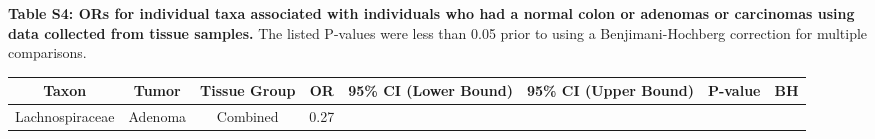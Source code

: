\documentclass[12pt,]{article}
\begin{document}
\normalsize

\newpage

\textbf{Table S4: ORs for individual taxa associated with individuals
who had a normal colon or adenomas or carcinomas using data collected
from tissue samples.} The listed P-values were less than 0.05 prior to
using a Benjimani-Hochberg correction for multiple comparisons.

\scriptsize

\begin{longtable}[]{@{}cccccccc@{}}
\toprule
\begin{minipage}[b]{0.18\columnwidth}\centering\strut
Taxon\strut
\end{minipage} & \begin{minipage}[b]{0.07\columnwidth}\centering\strut
Tumor\strut
\end{minipage} & \begin{minipage}[b]{0.09\columnwidth}\centering\strut
Tissue Group\strut
\end{minipage} & \begin{minipage}[b]{0.03\columnwidth}\centering\strut
OR\strut
\end{minipage} & \begin{minipage}[b]{0.14\columnwidth}\centering\strut
95\% CI (Lower Bound)\strut
\end{minipage} & \begin{minipage}[b]{0.14\columnwidth}\centering\strut
95\% CI (Upper Bound)\strut
\end{minipage} & \begin{minipage}[b]{0.06\columnwidth}\centering\strut
P-value\strut
\end{minipage} & \begin{minipage}[b]{0.06\columnwidth}\centering\strut
BH\strut
\end{minipage}\tabularnewline
\midrule
\endhead
\begin{minipage}[t]{0.18\columnwidth}\centering\strut
Lachnospiraceae\strut
\end{minipage} & \begin{minipage}[t]{0.07\columnwidth}\centering\strut
Adenoma\strut
\end{minipage} & \begin{minipage}[t]{0.09\columnwidth}\centering\strut
Combined\strut
\end{minipage} & \begin{minipage}[t]{0.03\columnwidth}\centering\strut
0.27\strut
\end{minipage} & \begin{minipage}[t]{0.14\columnwidth}\centering\strut

\end{minipage}
\end{longtable}
\end{document}
